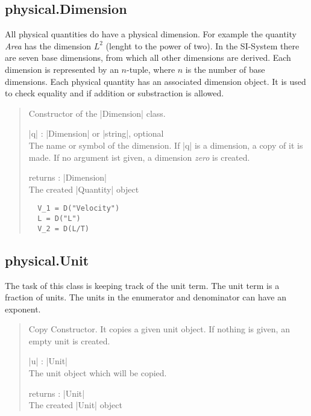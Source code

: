 \documentclass{ltxdoc}
\renewcommand{\emph}[1]{\textit{#1}}
\begin{document}
\newpage
\subsection{physical.Dimension}

 All physical quantities do have a physical dimension. For example the quantity \emph{Area} has the dimension $L^2$ (lenght to the power of two). In the SI-System there are seven base dimensions, from which all other dimensions are derived. Each dimension is represented by an $n$-tuple, where $n$ is the number of base dimensions. Each physical quantity has an associated dimension object. It is used to check equality and if addition or substraction is allowed.


\begin{quote}
  Constructor of the |Dimension| class.

  \begin{description}
  \item |q| : |Dimension| or |string|, optional\\
    The name or symbol of the dimension. If |q| is a dimension, a copy of it is made. If no argument ist given, a dimension \emph{zero} is created.

  \item returns : |Dimension|\\
    The created |Quantity| object
  \end{description}


  \subtitle{Example}
  \begin{lstlisting}
  V_1 = D("Velocity")
  L = D("L")
  V_2 = D(L/T)
  \end{lstlisting}
\end{quote}









\newpage
\subsection{physical.Unit}

The task of this class is keeping track of the unit term. The unit term is a fraction of units. The units in the enumerator and denominator can have an exponent. 


\begin{quote}
  Copy Constructor. It copies a given unit object. If nothing is given, an empty unit is created.

  \begin{description}
  \item |u| : |Unit|\\
    The unit object which will be copied.

  \item returns : |Unit|\\
    The created |Unit| object
  \end{description}

\end{quote}
\end{document}
